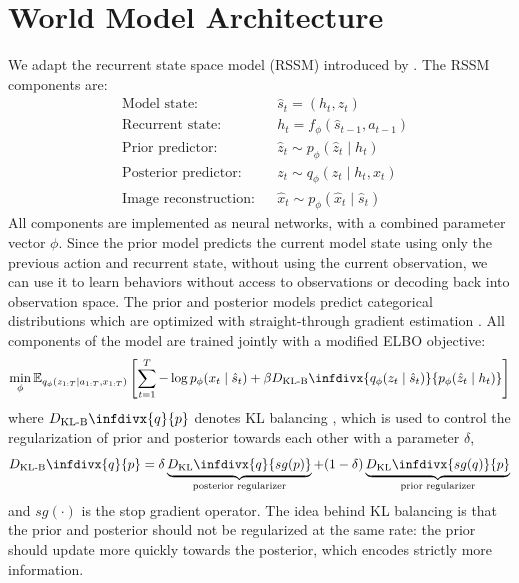 \documentclass[10pt]{article} %
\newcommand{\klb}{D_{\text{KL-B}}\infdivx}
\newcommand{\kl}{D_{\text{KL}}\infdivx}
\theoremstyle{plain}
\theoremstyle{definition}
\theoremstyle{remark}
\begin{document}
\section{World Model Architecture}

We adapt the recurrent state space model (RSSM) introduced by \cite{dreamerv2}. The RSSM components are:
\begin{equation}\label{modelcomponents}
\begin{aligned}
    &\text{Model state:} &&\hat{s}_t = (h_t, z_t)\\
    &\text{Recurrent state:} &&h_t = f_\phi(\hat{s}_{t-1}, a_{t-1})\\
    &\text{Prior predictor:} &&\hat{z}_t \sim p_\phi(\hat{z}_t \mid h_t) \\
    &\text{Posterior predictor:} &&z_t \sim q_\phi(z_t \mid h_t, x_t) \\
    &\text{Image reconstruction:} &&\hat{x}_t \sim p_\phi(\hat{x}_t \mid \hat{s}_t)
\end{aligned}
\end{equation}
All components are implemented as neural networks, with a combined parameter vector $\phi$. Since the prior model predicts the current model state using only the previous action and recurrent state, without using the current observation, we can use it to learn behaviors without access to observations or decoding back into observation space. The prior and posterior models predict categorical distributions which are optimized with straight-through gradient estimation \citep{straight-through}. All components of the model are trained jointly with a modified ELBO objective:
\begin{equation}\label{ELBO}
    \min_{\phi}\mathbb{E}_{q_\phi(z_{1:T} \mid a_{1:T}, x_{1:T})}\left[
    \sum_{t=1}^T -\log p_\phi(x_t \mid \hat{s}_t) + \beta
    \klb{q_\phi(z_t \mid \hat{s}_t)}{ p_\phi(\hat{z}_t \mid h_t)}
    \right]
\end{equation}
where $\klb{q}{p}$ denotes KL balancing \citep{dreamerv2}, which is used to control the regularization of prior and posterior towards each other with a parameter $\delta$,
\begin{equation}
    \klb{q}{p} = \delta \underbrace{\kl{q}{sg(p)}}_{\text{posterior regularizer}} + (1-\delta)\underbrace{\kl{sg(q)}{p}}_{\text{prior regularizer}}
\end{equation}
and $sg(\cdot)$ is the stop gradient operator. The idea behind KL balancing is that the prior and posterior should not be regularized at the same rate: the prior should update more quickly towards the posterior, which encodes strictly more information.
\end{document}
